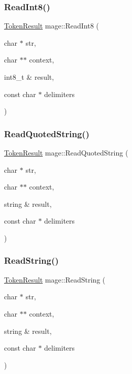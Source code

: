\hypertarget{namespacemage_a53968b4c1082fa6042a1278a1fb628d1}{}\label{namespacemage_a53968b4c1082fa6042a1278a1fb628d1} 
\subsubsection{\texorpdfstring{Read\+Int8()}{ReadInt8()}}
{\footnotesize\ttfamily \hyperlink{namespacemage_a2178ba2411db5912f41b2e7698c2037d}{Token\+Result} mage\+::\+Read\+Int8 (\begin{DoxyParamCaption}\item[{char $\ast$}]{str,  }\item[{char $\ast$$\ast$}]{context,  }\item[{int8\+\_\+t \&}]{result,  }\item[{const char $\ast$}]{delimiters }\end{DoxyParamCaption})}

\hypertarget{namespacemage_a0d98db3ab52b137bc811727c68659329}{}\label{namespacemage_a0d98db3ab52b137bc811727c68659329} 
\subsubsection{\texorpdfstring{Read\+Quoted\+String()}{ReadQuotedString()}}
{\footnotesize\ttfamily \hyperlink{namespacemage_a2178ba2411db5912f41b2e7698c2037d}{Token\+Result} mage\+::\+Read\+Quoted\+String (\begin{DoxyParamCaption}\item[{char $\ast$}]{str,  }\item[{char $\ast$$\ast$}]{context,  }\item[{string \&}]{result,  }\item[{const char $\ast$}]{delimiters }\end{DoxyParamCaption})}

\hypertarget{namespacemage_aa4f9ae6b6aa815ab879d4ea1f0453172}{}\label{namespacemage_aa4f9ae6b6aa815ab879d4ea1f0453172} 
\subsubsection{\texorpdfstring{Read\+String()}{ReadString()}}
{\footnotesize\ttfamily \hyperlink{namespacemage_a2178ba2411db5912f41b2e7698c2037d}{Token\+Result} mage\+::\+Read\+String (\begin{DoxyParamCaption}\item[{char $\ast$}]{str,  }\item[{char $\ast$$\ast$}]{context,  }\item[{string \&}]{result,  }\item[{const char $\ast$}]{delimiters }\end{DoxyParamCaption})}

